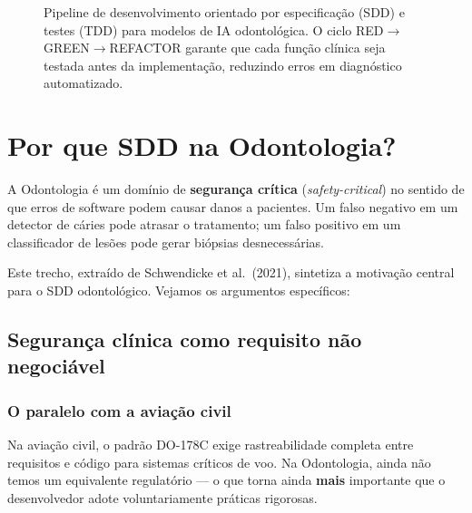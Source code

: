 \begin{figure}[H]
\caption{Pipeline de desenvolvimento orientado por especificação (SDD) e testes (TDD) para modelos de IA odontológica. O ciclo RED$\rightarrow$GREEN$\rightarrow$REFACTOR garante que cada função clínica seja testada antes da implementação, reduzindo erros em diagnóstico automatizado.}
\label{fig:sdd-tdd-pipeline}
\end{figure}


\section{Por que SDD na Odontologia?}

A Odontologia é um domínio de \textbf{segurança crítica} (\textit{safety-critical})
no sentido de que erros de software podem causar danos a pacientes. Um falso
negativo em um detector de cáries pode atrasar o tratamento; um falso positivo
em um classificador de lesões pode gerar biópsias desnecessárias.

 


Este trecho, extraído de Schwendicke et al.\ (2021), sintetiza a
motivação central para o SDD odontológico. Vejamos os argumentos
específicos:

\subsection{Segurança clínica como requisito não negociável}

\subsubsection{O paralelo com a aviação civil}

Na aviação civil, o padrão DO-178C exige rastreabilidade completa entre
requisitos e código para sistemas críticos de voo. Na Odontologia, ainda
não temos um equivalente regulatório — o que torna ainda \textbf{mais}
importante que o desenvolvedor adote voluntariamente práticas rigorosas.

